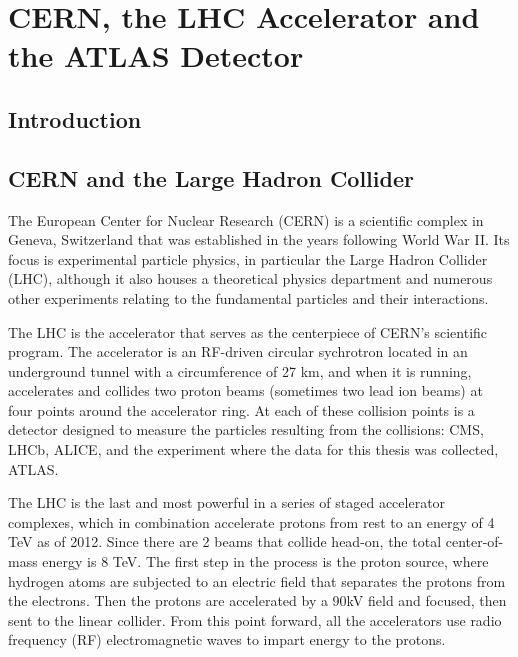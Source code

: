  

\chapter[ATLAS Detector]{CERN, the LHC Accelerator and the ATLAS Detector}




\section{Introduction}

\section{CERN and the Large Hadron Collider}
The European Center for Nuclear Research (CERN) is a scientific complex in Geneva, Switzerland that was established in the years following World War II.  Its focus is experimental particle physics, in particular the Large Hadron Collider (LHC), although it also houses a theoretical physics department and numerous other experiments relating to the fundamental particles and their interactions.  

The LHC is the accelerator that serves as the centerpiece of CERN's scientific program.  The accelerator is an RF-driven circular sychrotron located in an underground tunnel with a circumference of 27 km, and when it is running, accelerates and collides two proton beams (sometimes two lead ion beams) at four points around the accelerator ring.  At each of these collision points is a detector designed to measure the particles resulting from the collisions: CMS, LHCb, ALICE, and the experiment where the data for this thesis was collected, ATLAS.

The LHC is the last and most powerful in a series of staged accelerator complexes, which in combination accelerate protons from rest to an energy of 4 TeV as of 2012.  Since there are 2 beams that collide head-on, the total center-of-mass energy is 8 TeV.  The first step in the process is the proton source, where hydrogen atoms are subjected to an electric field that separates the protons from the electrons.  Then the protons are accelerated by a 90kV field and focused, then sent to the linear collider.  From this point forward, all the accelerators use radio frequency (RF) electromagnetic waves to impart energy to the protons.  

